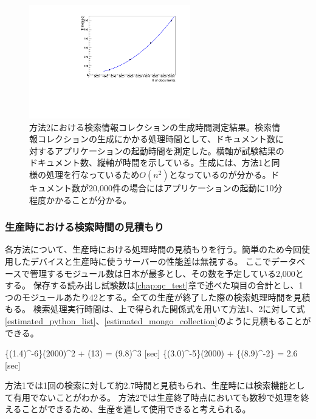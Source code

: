 \begin{figure}[bpt]
  \begin{center}
  \includegraphics[width=7cm,angle=270]{./creating_cache_time.pdf}
  \caption[方法2における検索情報コレクションの生成時間測定結果]{方法2における検索情報コレクションの生成時間測定結果。検索情報コレクションの生成にかかる処理時間として、ドキュメント数に対するアプリケーションの起動時間を測定した。横軸が試験結果のドキュメント数、縦軸が時間を示している。生成には、方法1と同様の処理を行なっているため$O(n^2)$となっているのが分かる。ドキュメント数が20,000件の場合にはアプリケーションの起動に10分程度かかることが分かる。}
  \label{creating_cache_time}
  \end{center}
\end{figure}

\subsubsection{生産時における検索時間の見積もり}
各方法について、生産時における処理時間の見積もりを行う。簡単のため今回使用したデバイスと生産時に使うサーバーの性能差は無視する。
ここでデータベースで管理するモジュール数は日本が最多とし、その数を予定している2,000とする。
保存する読み出し試験数は\ref{chap:qc_test}章で述べた項目の合計とし、1つのモジュールあたり42とする。全ての生産が終了した際の検索処理時間を見積もる。
検索処理実行時間は、上で得られた関係式を用いて方法1、2に対して式\ref{estimated_python_list}、\ref{estimated_mongo_collection}のように見積もることができる。

\bbb
\{(1.4)^{-6}\}\times(2000)^2 + (13) = (9.8)^{3} [\rm{sec}]
\label{estimated_python_list}
\eee
\bbb
\{(3.0)^{-5}\}\times(2000) + \{(8.9)^{-2}\} = 2.6 [\rm{sec}]
\label{estimated_mongo_collection}
\eee

方法1では1回の検索に対して約2.7時間と見積もられ、生産時には検索機能として有用でないことがわかる。
方法2では生産終了時点においても数秒で処理を終えることができるため、生産を通して使用できると考えられる。
 

